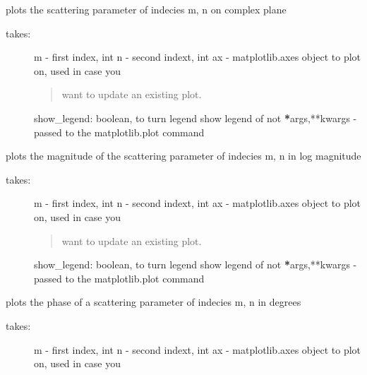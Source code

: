 \documentclass[letterpaper,10pt,english]{sphinxmanual}
\begin{document}
\begin{fulllineitems}
\begin{fulllineitems}
\label{api/mwavepy:mwavepy.network.Network.plot_s_complex}
plots the scattering parameter of indecies m, n on complex plane
\begin{description}
\item[{takes:}] \leavevmode
m - first index, int
n - second indext, int
ax - matplotlib.axes object to plot on, used in case you
\begin{quote}

want to update an existing plot.
\end{quote}

show\_legend: boolean, to turn legend show legend of not
{\color{red}\bfseries{}*}args,**kwargs - passed to the matplotlib.plot command

\end{description}

\end{fulllineitems}


\begin{fulllineitems}
\label{api/mwavepy:mwavepy.network.Network.plot_s_db}
plots the magnitude of the scattering parameter of indecies m, n
in log magnitude
\begin{description}
\item[{takes:}] \leavevmode
m - first index, int
n - second indext, int
ax - matplotlib.axes object to plot on, used in case you
\begin{quote}

want to update an existing plot.
\end{quote}

show\_legend: boolean, to turn legend show legend of not
{\color{red}\bfseries{}*}args,**kwargs - passed to the matplotlib.plot command

\end{description}

\end{fulllineitems}


\begin{fulllineitems}
\label{api/mwavepy:mwavepy.network.Network.plot_s_deg}
plots the phase of a scattering parameter of indecies m, n in
degrees
\begin{description}
\item[{takes:}] \leavevmode
m - first index, int
n - second indext, int
ax - matplotlib.axes object to plot on, used in case you
\begin{quote}


\end{quote}
\end{description}
\end{fulllineitems}
\end{fulllineitems}
\end{document}
